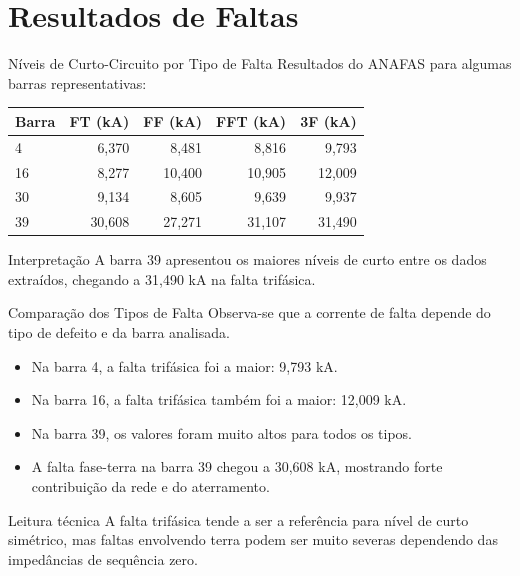 \documentclass[aspectratio=169,11pt]{beamer}
\begin{document}
\section{Resultados de Faltas}

\begin{frame}{Níveis de Curto-Circuito por Tipo de Falta}
  Resultados do ANAFAS para algumas barras representativas:

  \begin{table}
    \centering
    \small
    \begin{tabular}{lrrrr}
      \toprule
      Barra & FT (kA) & FF (kA) & FFT (kA) & 3F (kA) \\
      \midrule
      4 & 6,370 & 8,481 & 8,816 & 9,793 \\
      16 & 8,277 & 10,400 & 10,905 & 12,009 \\
      30 & 9,134 & 8,605 & 9,639 & 9,937 \\
      39 & 30,608 & 27,271 & 31,107 & 31,490 \\
      \bottomrule
    \end{tabular}
  \end{table}

  \begin{block}{Interpretação}
    A barra 39 apresentou os maiores níveis de curto entre os dados extraídos, chegando a 31,490 kA na falta trifásica.
  \end{block}
\end{frame}

\begin{frame}{Comparação dos Tipos de Falta}
  Observa-se que a corrente de falta depende do tipo de defeito e da barra analisada.

  \begin{itemize}
    \item Na barra 4, a falta trifásica foi a maior: 9,793 kA.
    \item Na barra 16, a falta trifásica também foi a maior: 12,009 kA.
    \item Na barra 39, os valores foram muito altos para todos os tipos.
    \item A falta fase-terra na barra 39 chegou a 30,608 kA, mostrando forte contribuição da rede e do aterramento.
  \end{itemize}

  \begin{block}{Leitura técnica}
    A falta trifásica tende a ser a referência para nível de curto simétrico, mas faltas envolvendo terra podem ser muito severas dependendo das impedâncias de sequência zero.
  \end{block}
\end{frame}
\end{document}
